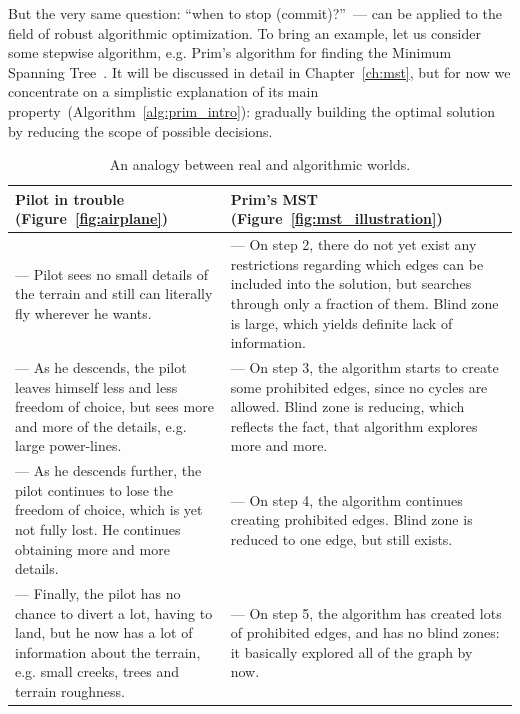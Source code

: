 But the very same question: ``when to stop (commit)?''~--- can be applied to the
field of robust algorithmic optimization. To bring an example, let us consider
some stepwise algorithm, e.g. Prim's algorithm for finding the Minimum Spanning
Tree~\citep{prim57}.  It will be discussed in
detail in Chapter~\ref{ch:mst}, but for now we concentrate on a simplistic
explanation of its main property~(Algorithm~\ref{alg:prim_intro}): gradually
building the optimal solution by reducing the scope of possible decisions.

\begin{table}[t!]
\centering
\begin{tabular}{p{5cm}p{5cm}}
\toprule
Pilot in trouble (Figure~\ref{fig:airplane}) & Prim's MST
(Figure~\ref{fig:mst_illustration})
\tabularnewline \midrule
    --- Pilot sees no small details of the terrain and still can literally fly
        wherever he wants.
    &
    --- On step 2, there do not yet exist any restrictions regarding which edges
        can be included into the solution, but searches through only a fraction
        of them. Blind zone is large, which yields definite lack of information.
        \tabularnewline
    --- As he descends, the pilot leaves himself less and less freedom of choice, but
    sees more and more of the details, e.g. large power-lines.
    &
    --- On step 3, the algorithm starts to create some prohibited edges,
    since no cycles are allowed. Blind zone is reducing, which reflects the fact,
    that algorithm explores more and more. \tabularnewline
    --- As he descends further, the pilot continues to lose the freedom of choice, which is yet not
    fully lost. He continues obtaining more and more details. 
    &
    --- On step 4, the algorithm continues creating prohibited edges. Blind zone is
    reduced to one edge, but still exists. \tabularnewline
    --- Finally, the pilot has no chance to divert a lot, having to land, but he now
    has a lot of information about the terrain, e.g. small creeks, trees and
    terrain roughness.
    &
    --- On step 5, the algorithm has created lots of prohibited edges, and has no
    blind zones: it basically explored all of the graph by now. \tabularnewline
\bottomrule
\end{tabular}
\caption{An analogy between real and algorithmic worlds.}
\label{table:mst_algorithm_and_pilot}
\end{table}

